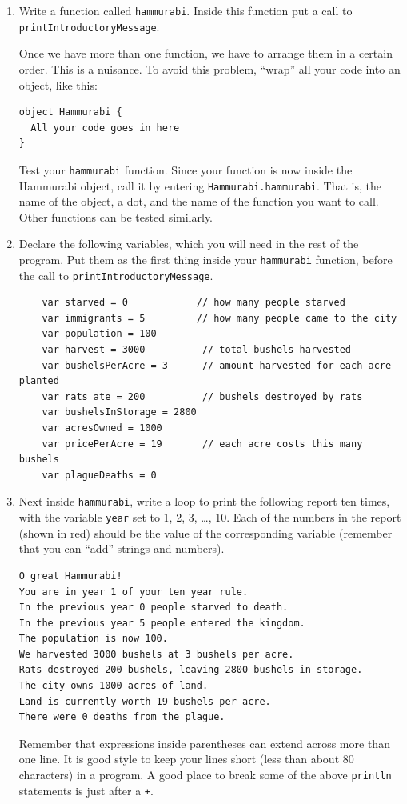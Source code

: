 \documentclass[12pt,a4paper,times]{article}
\begin{document}
\begin{enumerate}
Save and load the modified program. Since the
  \texttt{println} expression is now inside a function, it is not
  automatically executed when you load the program. To run it,
  enter \texttt{printIntroductoryMessage}
\item
  Write a function called \texttt{hammurabi}. Inside this function put a
  call to \texttt{printIntroductoryMessage}.

  Once we have more than one function, we have to arrange them in a
  certain order. This is a nuisance. To avoid this problem, ``wrap'' all
  your code into an {object}, like this:

\begin{Verbatim}
object Hammurabi {
  All your code goes in here
}
\end{Verbatim}
Test your \texttt{hammurabi} function. Since your function is now
inside the Hammurabi object, call it by entering
\texttt{Hammurabi.hammurabi}. That is, the name of the object, a dot,
and the name of the function you want to call. Other functions can be
tested similarly.

\item\label{variables}
  Declare the following variables, which you will need in the rest of
  the program. Put them as the first thing inside your
  \texttt{hammurabi} function, before the call to
  \texttt{printIntroductoryMessage}.
\begin{Verbatim}
    var starved = 0            // how many people starved
    var immigrants = 5         // how many people came to the city
    var population = 100
    var harvest = 3000          // total bushels harvested
    var bushelsPerAcre = 3      // amount harvested for each acre planted
    var rats_ate = 200          // bushels destroyed by rats
    var bushelsInStorage = 2800
    var acresOwned = 1000
    var pricePerAcre = 19       // each acre costs this many bushels
    var plagueDeaths = 0
\end{Verbatim}
\item
  Next inside \texttt{hammurabi}, write a loop to print the following
  report ten times, with the variable \texttt{year} set to 1, 2, 3,
  \ldots{}, 10. Each of the numbers in the report (shown in red) should
  be the value of the corresponding variable (remember that you can
  ``add'' strings and numbers).
\begin{Verbatim}
O great Hammurabi!
You are in year 1 of your ten year rule.
In the previous year 0 people starved to death.
In the previous year 5 people entered the kingdom.
The population is now 100.
We harvested 3000 bushels at 3 bushels per acre.
Rats destroyed 200 bushels, leaving 2800 bushels in storage.
The city owns 1000 acres of land.
Land is currently worth 19 bushels per acre.
There were 0 deaths from the plague.
\end{Verbatim}
  Remember that expressions inside parentheses can extend across more
  than one line. It is good style to keep your lines short (less than
  about 80 characters) in a program. A good place to break some of the
  above \texttt{println} statements is just after a
  \texttt{+}.
  

\end{enumerate}
\end{document}
